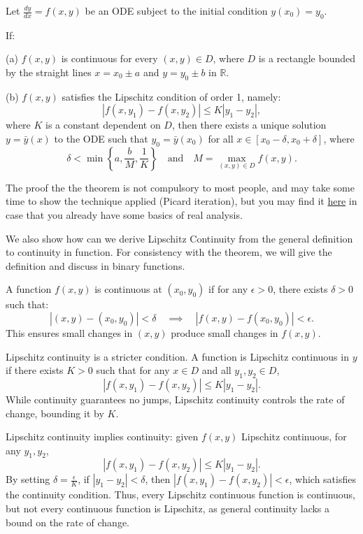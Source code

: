 \begin{theorem}
Let $\frac{dy}{dx} = f(x, y)$
be an ODE subject to the initial condition \( y(x_0) = y_0 \).

If:

(a) \( f(x, y) \) is continuous for every \( (x, y) \in D \), where \( D \) is a rectangle bounded by the straight lines \( x = x_0 \pm a \) and \( y = y_0 \pm b \) in \( \mathbb{R} \).

(b) \( f(x, y) \) satisfies the Lipschitz condition of order 1, namely:
\[
|f(x, y_1) - f(x, y_2)| \leq K |y_1 - y_2|,
\]
where \( K \) is a constant dependent on \( D \), then there exists a unique solution \( y = \bar{y}(x) \) to the ODE such that \( y_0 = \bar{y}(x_0) \) for all \( x \in [x_0 - \delta, x_0 + \delta] \), where
\[
\delta < \min \left\{ a, \frac{b}{M}, \frac{1}{K} \right\} \quad \text{and} \quad M = \max_{(x, y) \in D} f(x, y).
\]
\end{theorem}
\begin{remark}
    The proof the the theorem is not compulsory to most people, and may take some time to show the technique applied (Picard iteration), but you may find it \href{https://en.wikipedia.org/wiki/Picard%E2%80%93Lindel%C3%B6f_theorem}{here} in case that you already have some basics of real analysis.
\end{remark}
     We also show how can we derive Lipschitz Continuity from the general definition to continuity in function. For consistency with the theorem, we will give the definition and discuss in binary functions.
\begin{definition}[Continuity]
    A function \( f(x, y) \) is continuous at \( (x_0, y_0) \) if for any \( \epsilon > 0 \), there exists \( \delta > 0 \) such that:
\[
|(x, y) - (x_0, y_0)| < \delta \quad \implies \quad |f(x, y) - f(x_0, y_0)| < \epsilon.
\]
This ensures small changes in \( (x, y) \) produce small changes in \( f(x, y) \).
\end{definition}
Lipschitz continuity is a stricter condition. A function is Lipschitz continuous in \( y \) if there exists \( K > 0 \) such that for any \( x \in D \) and all \( y_1, y_2 \in D \),
\[
|f(x, y_1) - f(x, y_2)| \leq K |y_1 - y_2|.
\]
While continuity guarantees no jumps, Lipschitz continuity controls the rate of change, bounding it by \( K \).

Lipschitz continuity implies continuity: given \( f(x, y) \) Lipschitz continuous, for any \( y_1, y_2 \),
\[
|f(x, y_1) - f(x, y_2)| \leq K |y_1 - y_2|.
\]
By setting \( \delta = \frac{\epsilon}{K} \), if \( |y_1 - y_2| < \delta \), then \( |f(x, y_1) - f(x, y_2)| < \epsilon \), which satisfies the continuity condition. Thus, every Lipschitz continuous function is continuous, but not every continuous function is Lipschitz, as general continuity lacks a bound on the rate of change.

